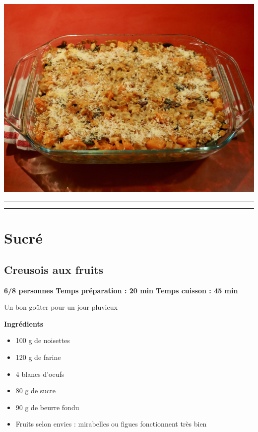 \documentclass[]{book}
\providecommand{\tightlist}{%
  \setlength{\itemsep}{0pt}\setlength{\parskip}{0pt}}
\begin{document}
\begin{center}\includegraphics[width=0.9\linewidth]{photos/crozet} \end{center}

\begin{center}\rule{0.5\linewidth}{0.5pt}\end{center}

\begin{center}\rule{0.5\linewidth}{0.5pt}\end{center}

\hypertarget{sucruxe9-3}{%
\section*{Sucré}\label{sucruxe9-3}}

\hypertarget{creusois-aux-fruits}{%
\subsection*{\texorpdfstring{{Creusois aux fruits}}{Creusois aux fruits}}\label{creusois-aux-fruits}}

\begin{sucrebox}
\textbf{6/8 personnes \textbar{} Temps préparation : 20 min \textbar{}
Temps cuisson : 45 min}

Un bon goûter pour un jour pluvieux
\end{sucrebox}

\textbf{Ingrédients}

\begin{itemize}
\tightlist
\item
  100 g de noisettes
\item
  120 g de farine
\item
  4 blancs d'oeufs
\item
  80 g de sucre
\item
  90 g de beurre fondu
\item
  Fruits selon envies : mirabelles ou figues fonctionnent très bien
\end{itemize}
\end{document}
